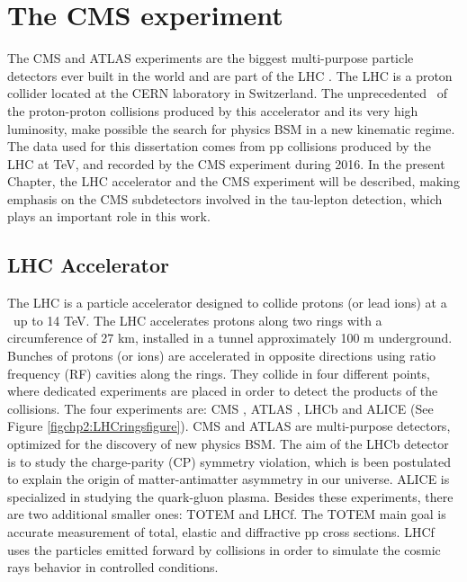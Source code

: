 \chapter[Experimental Setup]{The CMS experiment}
\label{chap:CMSExp}
The CMS and ATLAS experiments are the biggest multi-purpose particle detectors
ever built in the world and  are part of the LHC \cite{chp2:LHCTDR}. The LHC is a 
proton collider located at the CERN laboratory in Switzerland. The 
unprecedented \centermassenergy~of the proton-proton collisions 
produced by this accelerator and its very high luminosity, make possible the search
for physics BSM in a new kinematic regime. The data used for this dissertation comes from
pp collisions produced by the LHC at  TeV, and recorded by the CMS experiment during 2016.
In the present Chapter, the LHC accelerator and the CMS experiment will be
described, making emphasis on the CMS subdetectors involved in the 
tau-lepton detection, which plays an important role in this work. 


\section{LHC Accelerator}
\label{sec:LHC}
The LHC is a particle accelerator designed to collide protons (or lead ions) at 
a \centermassenergy~up to 14 TeV. The LHC accelerates protons along 
two rings with a circumference of 27 km, installed in a tunnel 
approximately 100 m underground. Bunches of protons (or ions)
are accelerated in opposite directions using ratio frequency (RF) cavities along the rings. They 
collide in four different points, where dedicated experiments are placed 
in order to detect the products of the collisions. The four experiments
are: CMS \cite{chp2:CMSTDR,chp2:CMSTDR2}, 
ATLAS \cite{chp2:ATLASTDR}, LHCb \cite{chp2:LHCb} and  ALICE \cite{chp2:ALICETDR} (See Figure \ref{figchp2:LHCringsfigure}). CMS 
and ATLAS are multi-purpose detectors, optimized for the discovery of new physics BSM. The aim of the LHCb detector is to study 
the charge-parity (CP) symmetry violation, which is been postulated to explain the origin of matter-antimatter 
asymmetry in our universe. ALICE is specialized in studying the quark-gluon plasma. Besides these experiments, there 
are two additional smaller ones: TOTEM and LHCf. The TOTEM main goal is accurate measurement of total, elastic and diffractive pp
cross sections. LHCf uses the particles emitted forward by collisions in order to simulate
the cosmic rays behavior in controlled conditions. 

